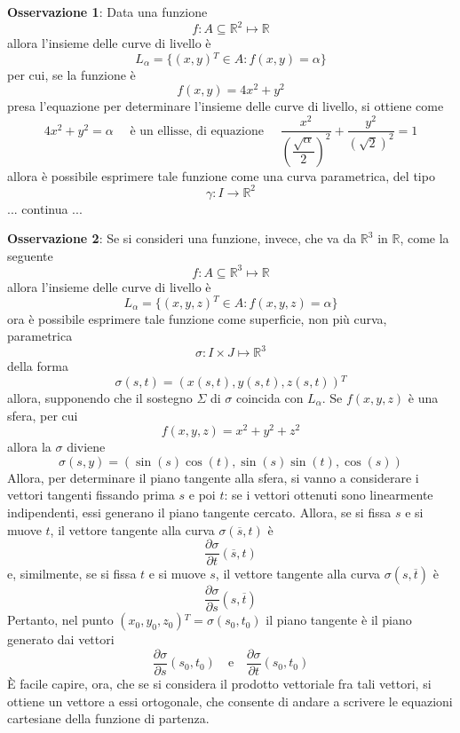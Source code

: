 \documentclass[a4paper]{extarticle}
\begin{document}
\vspace{1em}
\noindent
\textbf{Osservazione 1}: Data una funzione
\[f : A \subseteq \mathbb{R}^2 \longmapsto \mathbb{R}\]
allora l'insieme delle curve di livello è
\[L_\alpha = \{(x,y){^T} \in A : f(x,y)=\alpha\}\]
per cui, se la funzione è
\[f(x,y) = 4x^2+y^2\]
presa l'equazione per determinare l'insieme delle curve di livello, si ottiene come
\[4x^2+y^2=\alpha \hspace{1em} \text{ è un ellisse, di equazione } \hspace{1em} \dfrac{x^2}{\left(\dfrac{\sqrt{\alpha}}{2}\right)^2} + \dfrac{y^2}{\left(\sqrt{2}\right)^2} = 1\]
allora è possibile esprimere tale funzione come una curva parametrica, del tipo
\[\gamma : I \rightarrow \mathbb{R}^2\]
... continua ...

\vspace{1em}
\noindent
\textbf{Osservazione 2}: Se si consideri una funzione, invece, che va da $\mathbb{R}^3$ in $\mathbb{R}$, come la seguente
\[f : A \subseteq \mathbb{R}^3 \longmapsto \mathbb{R}\]
allora l'insieme delle curve di livello è
\[L_\alpha = \{(x,y,z){^T} \in A : f(x,y,z)=\alpha\}\]
ora è possibile esprimere tale funzione come superficie, non più curva, parametrica
\[\sigma : I \times J \longmapsto \mathbb{R}^3\]
della forma
\[\sigma(s,t) = \left(x(s,t),y(s,t),z(s,t)\right){^T}\]
allora, supponendo che il sostegno $\Sigma$ di $\sigma$ coincida con $L_\alpha$. Se $f(x,y,z)$ è una sfera, per cui
\[f(x,y,z)=x^2+y^2+z^2\]
allora la $\sigma$ diviene
\[\sigma(s,y)= \left(\sin(s)\cos(t),\sin(s)\sin(t),\cos(s)\right)\]
Allora, per determinare il piano tangente alla sfera, si vanno a considerare i vettori tangenti fissando prima $s$ e poi $t$: se i vettori ottenuti sono linearmente indipendenti, essi generano il piano tangente cercato.
Allora, se si fissa $s$ e si muove $t$, il vettore tangente alla curva $\sigma(\overline{s},t)$ è
\[\frac{\partial \sigma}{\partial t} (\overline{s}, t)\]
e, similmente, se si fissa $t$ e si muove $s$, il vettore tangente alla curva $\sigma(s,\overline{t})$ è
\[\frac{\partial \sigma}{\partial s}(s,\overline{t})\]
Pertanto, nel punto $(x_0,y_0,z_0){^T} = \sigma(s_0,t_0)$ il piano tangente è il piano generato dai vettori
\[\frac{\partial \sigma}{\partial s}(s_0,t_0) \hspace{1em} \text{e} \hspace{1em} \frac{\partial \sigma}{\partial t} (s_0,t_0)\]
È facile capire, ora, che se si considera il prodotto vettoriale fra tali vettori, si ottiene un vettore a essi ortogonale, che consente di andare a scrivere le equazioni cartesiane della funzione di partenza.\\
\end{document}
